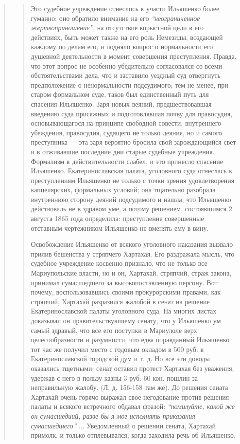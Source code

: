 \begin{quote}
\begin{quote}
Это судебное учреждение отнеслось к участи
Ильяшенко более гуманно: оно обратило внимание на его
\emph{``неограниченное жертвоприношение''}, на отсутствие корыстной
цели в его действиях, быть может также на его роль
Немезиды, воздающей каждому по делам его, и подняло
вопрос о нормальности его душевной деятельности в момент совершения преступления.
Правда, что этот вопрос не особенно убедительно согласовался со всеми обстоятельствами дела,
что и заставило уездный суд отвергнуть предположение о ненормальности подсудимого; тем не менее,
при старом формальном суде, таков был единственный
путь для спасения Ильяшенко. Заря новых веяний, предшествовавшая 
введению суда присяжных и подготовлявшая
почву для правосудия, основывающагося на принципе свободной совести, 
внутреннего убеждения, правосудия, судящего
не только деяния, но и самого преступника — эта заря вероятно бросила
свой зарождающийся свет и в отживавшие
последние дни старые судебные учреждения. Формализм в
действительности слабел, и это принесло спасение Ильяшенко.
Екатеринославская палата, уголовного суда отнеслась
к преступлениям Ильяшенко не только с точки зрения
удовлетворения капцелярских, формальных условий; она
тщательно разобрала внутреннюю сторону деяний подсудимого
и нашла, что Ильяшенко действоваль не в здравом уме,
а потому решением, состоявшимся 2 августа 1865 года
определила: преступление совершенные отставным чертежником
Ильяшенко не вменять ему в вину.

Освобождение Ильяшенко от всякого уголовного наказания 
вызвало прилив бешенства у стряпчего Хартахая.
Его раздражала мысль, что судебное учреждение косвенно
признало, что не только все Мариупольские власти, но и
он, Хартахай, стряпчий, страж закона, принимал сумасшедшего за высокопоставленную персону. 
Вот почему, воспользовавшись своими прокурорскими правами, как стряпчий, Хартахай
разразился жалобой в сенат на решение 
Екатеринославской палаты уголовного суда. На многих
листах доказывал он правительствующему сенату, что у
Ильяшенко ум самый здравый, что все его поступки в
Мариулоле верх целесообразности и разумности, что едва
оправданный Ильяшенко тот час же получил место с годовым окладом в 500 руб.
в Екатеринославской городской дум и т. д. Но все эти доводы оказались тщетными:
сенат оставил протест Хартахая без уважения, удержав
с него в пользу казны 3 руб. 60 кон. пошлин за неправильную жалобу. (Л. д. 156-158 там же). До решения
сената Хартахай очень горячо выражал свое негодование
против решения палаты и всякого встречного обдавал
фразой: \emph{``помилуйте, какой же он сумасшедиий, разве бы
я мог исполнять приказания сумасшедшего''} ... Уведомленный о решении сената, Хартахай примолк, 
и только отплевывался, когда заходила речь об Ильяшенко.


\end{quote}
\end{quote}

